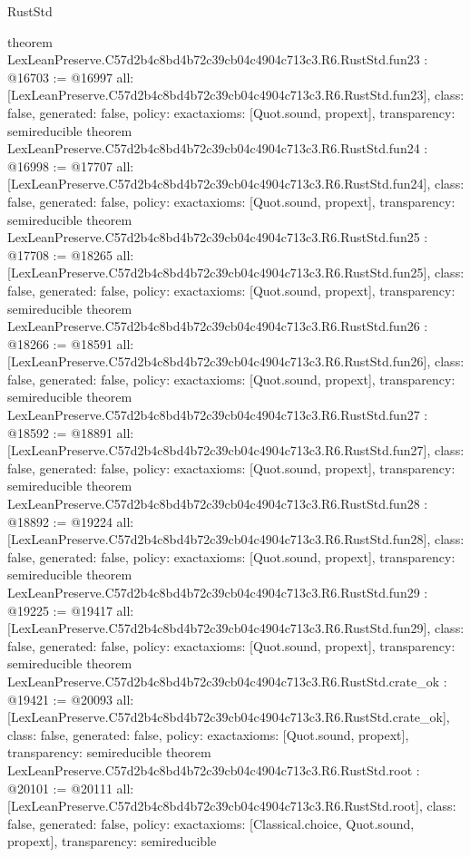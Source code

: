 \begin{lexlean}{RustStd}
\begin{coremodule}
{}
theorem LexLeanPreserve.C57d2b4c8bd4b72c39cb04c4904c713c3.R6.RustStd.fun23 : @16703 := @16997 {
  all: [LexLeanPreserve.C57d2b4c8bd4b72c39cb04c4904c713c3.R6.RustStd.fun23],
  class: false,
  generated: false,
  policy: exact{axioms: [Quot.sound, propext]},
  transparency: semireducible
}
theorem LexLeanPreserve.C57d2b4c8bd4b72c39cb04c4904c713c3.R6.RustStd.fun24 : @16998 := @17707 {
  all: [LexLeanPreserve.C57d2b4c8bd4b72c39cb04c4904c713c3.R6.RustStd.fun24],
  class: false,
  generated: false,
  policy: exact{axioms: [Quot.sound, propext]},
  transparency: semireducible
}
theorem LexLeanPreserve.C57d2b4c8bd4b72c39cb04c4904c713c3.R6.RustStd.fun25 : @17708 := @18265 {
  all: [LexLeanPreserve.C57d2b4c8bd4b72c39cb04c4904c713c3.R6.RustStd.fun25],
  class: false,
  generated: false,
  policy: exact{axioms: [Quot.sound, propext]},
  transparency: semireducible
}
theorem LexLeanPreserve.C57d2b4c8bd4b72c39cb04c4904c713c3.R6.RustStd.fun26 : @18266 := @18591 {
  all: [LexLeanPreserve.C57d2b4c8bd4b72c39cb04c4904c713c3.R6.RustStd.fun26],
  class: false,
  generated: false,
  policy: exact{axioms: [Quot.sound, propext]},
  transparency: semireducible
}
theorem LexLeanPreserve.C57d2b4c8bd4b72c39cb04c4904c713c3.R6.RustStd.fun27 : @18592 := @18891 {
  all: [LexLeanPreserve.C57d2b4c8bd4b72c39cb04c4904c713c3.R6.RustStd.fun27],
  class: false,
  generated: false,
  policy: exact{axioms: [Quot.sound, propext]},
  transparency: semireducible
}
theorem LexLeanPreserve.C57d2b4c8bd4b72c39cb04c4904c713c3.R6.RustStd.fun28 : @18892 := @19224 {
  all: [LexLeanPreserve.C57d2b4c8bd4b72c39cb04c4904c713c3.R6.RustStd.fun28],
  class: false,
  generated: false,
  policy: exact{axioms: [Quot.sound, propext]},
  transparency: semireducible
}
theorem LexLeanPreserve.C57d2b4c8bd4b72c39cb04c4904c713c3.R6.RustStd.fun29 : @19225 := @19417 {
  all: [LexLeanPreserve.C57d2b4c8bd4b72c39cb04c4904c713c3.R6.RustStd.fun29],
  class: false,
  generated: false,
  policy: exact{axioms: [Quot.sound, propext]},
  transparency: semireducible
}
theorem LexLeanPreserve.C57d2b4c8bd4b72c39cb04c4904c713c3.R6.RustStd.crate_ok : @19421 := @20093 {
  all: [LexLeanPreserve.C57d2b4c8bd4b72c39cb04c4904c713c3.R6.RustStd.crate_ok],
  class: false,
  generated: false,
  policy: exact{axioms: [Quot.sound, propext]},
  transparency: semireducible
}
theorem LexLeanPreserve.C57d2b4c8bd4b72c39cb04c4904c713c3.R6.RustStd.root : @20101 := @20111 {
  all: [LexLeanPreserve.C57d2b4c8bd4b72c39cb04c4904c713c3.R6.RustStd.root],
  class: false,
  generated: false,
  policy: exact{axioms: [Classical.choice, Quot.sound, propext]},
  transparency: semireducible
}


\end{coremodule}
\end{lexlean}
